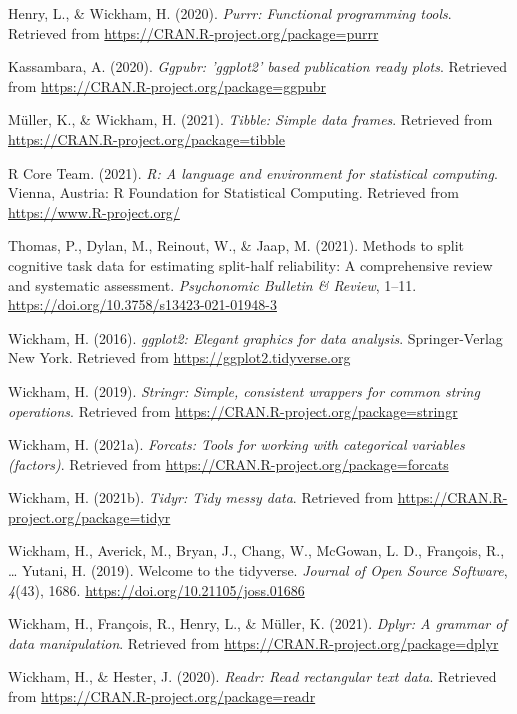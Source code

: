 \documentclass[
  man,floatsintext]{apa6}
\newlength{\cslhangindent}
\newlength{\cslentryspacingunit} %
\newenvironment{CSLReferences}[2] %
 {%
  \setlength{\parindent}{0pt}
  \ifodd #1
  \let\oldpar\par
  \def\par{\hangindent=\cslhangindent\oldpar}
  \fi
  \setlength{\parskip}{#2\cslentryspacingunit}
 }%
 {}
\begin{document}
\begin{CSLReferences}{1}{0}
\leavevmode{}%
Henry, L., \& Wickham, H. (2020). \emph{Purrr: Functional programming tools}. Retrieved from \url{https://CRAN.R-project.org/package=purrr}

\leavevmode{}%
Kassambara, A. (2020). \emph{Ggpubr: 'ggplot2' based publication ready plots}. Retrieved from \url{https://CRAN.R-project.org/package=ggpubr}

\leavevmode{}%
Müller, K., \& Wickham, H. (2021). \emph{Tibble: Simple data frames}. Retrieved from \url{https://CRAN.R-project.org/package=tibble}

\leavevmode{}%
R Core Team. (2021). \emph{R: A language and environment for statistical computing}. Vienna, Austria: R Foundation for Statistical Computing. Retrieved from \url{https://www.R-project.org/}

\leavevmode{}%
Thomas, P., Dylan, M., Reinout, W., \& Jaap, M. (2021). Methods to split cognitive task data for estimating split-half reliability: A comprehensive review and systematic assessment. \emph{Psychonomic Bulletin \& Review}, 1--11. \url{https://doi.org/10.3758/s13423-021-01948-3}

\leavevmode{}%
Wickham, H. (2016). \emph{ggplot2: Elegant graphics for data analysis}. Springer-Verlag New York. Retrieved from \url{https://ggplot2.tidyverse.org}

\leavevmode{}%
Wickham, H. (2019). \emph{Stringr: Simple, consistent wrappers for common string operations}. Retrieved from \url{https://CRAN.R-project.org/package=stringr}

\leavevmode{}%
Wickham, H. (2021a). \emph{Forcats: Tools for working with categorical variables (factors)}. Retrieved from \url{https://CRAN.R-project.org/package=forcats}

\leavevmode{}%
Wickham, H. (2021b). \emph{Tidyr: Tidy messy data}. Retrieved from \url{https://CRAN.R-project.org/package=tidyr}

\leavevmode{}%
Wickham, H., Averick, M., Bryan, J., Chang, W., McGowan, L. D., François, R., \ldots{} Yutani, H. (2019). Welcome to the {tidyverse}. \emph{Journal of Open Source Software}, \emph{4}(43), 1686. \url{https://doi.org/10.21105/joss.01686}

\leavevmode{}%
Wickham, H., François, R., Henry, L., \& Müller, K. (2021). \emph{Dplyr: A grammar of data manipulation}. Retrieved from \url{https://CRAN.R-project.org/package=dplyr}

\leavevmode{}%
Wickham, H., \& Hester, J. (2020). \emph{Readr: Read rectangular text data}. Retrieved from \url{https://CRAN.R-project.org/package=readr}

\end{CSLReferences}
\end{document}
